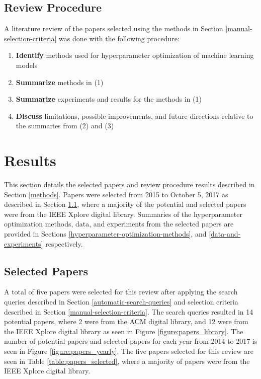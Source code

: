 \subsection{Review Procedure} \label{review-procedure}

A literature review of the papers selected using the methods in Section \ref{manual-selection-criteria} was done with the following procedure:

\begin{enumerate}
	\item \textbf{Identify} methods used for hyperparameter optimization of machine learning models
	\item \textbf{Summarize} methods in (1)
	\item \textbf{Summarize} experiments and results for the methods in (1)
	\item \textbf{Discuss} limitations, possible improvements, and future directions relative to the summaries from (2) and (3)
\end{enumerate}




\section{Results} \label{results}

This section details the selected papers and review procedure results described in Section \ref{methods}. Papers were selected from 2015 to October 5, 2017 as described in Section \ref{selected-papers}, where a majority of the potential and selected papers were from the IEEE Xplore digital library. Summaries of the hyperparameter optimization methods, data, and experiments from the selected papers are provided in Sections \ref{hyperparameter-optimization-methods}, and \ref{data-and-experiments} respectively.


\subsection{Selected Papers} \label{selected-papers}

A total of five papers were selected for this review after applying the search queries described in Section \ref{automatic-search-queries} and selection criteria described in Section \ref{manual-selection-criteria}. The search queries resulted in 14 potential papers, where 2 were from the ACM digital library, and 12 were from the IEEE Xplore digital library as seen in Figure \ref{figure:papers_library}. The number of potential papers and selected papers for each year from 2014 to 2017 is seen in Figure \ref{figure:papers_yearly}. The five papers selected for this review are seen in Table \ref{table:papers_selected}, where a majority of papers were from the IEEE Xplore digital library.

